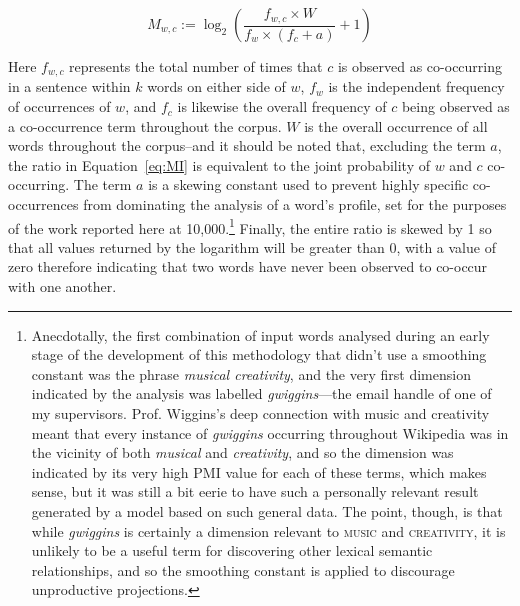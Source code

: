 \begin{equation}\label{eq:MI}
M_{w,c} := \log_2 \left(\frac{f_{w,c} \times W}{f_w \times \left(f_c + a\right)} + 1\right)
\end{equation}

\noindent Here $f_{w,c}$ represents the total number of times that $c$ is observed as co-occurring in a sentence within $k$ words on either side of $w$, $f_w$ is the independent frequency of occurrences of $w$, and $f_c$ is likewise the overall frequency of $c$ being observed as a co-occurrence term throughout the corpus.  $W$ is the overall occurrence of all words throughout the corpus--and it should be noted that, excluding the term $a$, the ratio in Equation~\ref{eq:MI} is equivalent to the joint probability of $w$ and $c$ co-occurring.  The term $a$ is a skewing constant used to prevent highly specific co-occurrences from dominating the analysis of a word's profile, set for the purposes of the work reported here at 10,000.\footnote{Anecdotally, the first combination of input words analysed during an early stage of the development of this methodology that didn't use a smoothing constant was the phrase \emph{musical creativity}, and the very first dimension indicated by the analysis was labelled \emph{gwiggins}---the email handle of one of my supervisors.  Prof. Wiggins's deep connection with music and creativity meant that every instance of \emph{gwiggins} occurring throughout Wikipedia was in the vicinity of both \emph{musical} and \emph{creativity}, and so the dimension was indicated by its very high PMI value for each of these terms, which makes sense, but it was still a bit eerie to have such a personally relevant result generated by a model based on such general data.  The point, though, is that while \emph{gwiggins} is certainly a dimension relevant to \textsc{music} and \textsc{creativity}, it is unlikely to be a useful term for discovering other lexical semantic relationships, and so the smoothing constant is applied to discourage unproductive projections.}  Finally, the entire ratio is skewed by 1 so that all values returned by the logarithm will be greater than 0, with a value of zero therefore indicating that two words have never been observed to co-occur with one another.

